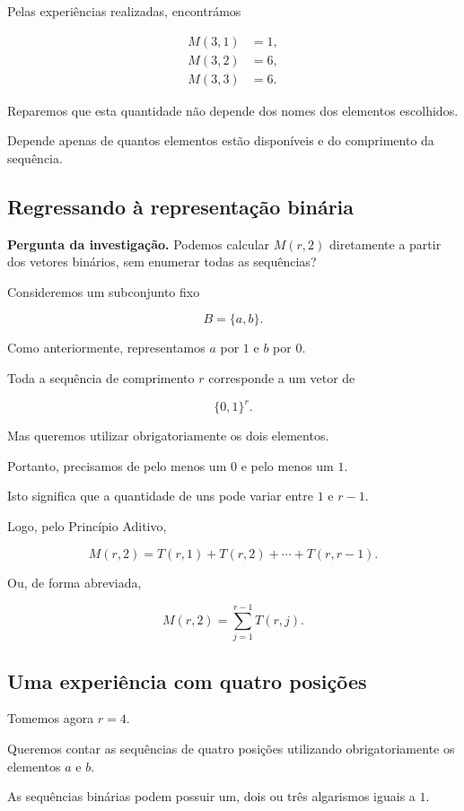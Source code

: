\documentclass[11pt,a4paper,oneside]{book}
\newcommand{\Pergunta}[1]{\begin{perguntabox}\textbf{Pergunta da investigação.} #1\end{perguntabox}}
\begin{document}
Pelas experiências realizadas, encontrámos

\[
\begin{aligned}
M(3,1)&=1,\\
M(3,2)&=6,\\
M(3,3)&=6.
\end{aligned}
\]

Reparemos que esta quantidade não depende
dos nomes dos elementos escolhidos.

Depende apenas de quantos elementos estão
disponíveis e do comprimento da sequência.

\subsection*{Regressando à representação binária}

\Pergunta{Podemos calcular $M(r,2)$ diretamente
a partir dos vetores binários, sem enumerar
todas as sequências?}

Consideremos um subconjunto fixo

\[
B=\{a,b\}.
\]

Como anteriormente, representamos $a$ por $1$
e $b$ por $0$.

Toda a sequência de comprimento $r$
corresponde a um vetor de

\[
\{0,1\}^r.
\]

Mas queremos utilizar obrigatoriamente
os dois elementos.

Portanto, precisamos de pelo menos um $0$
e pelo menos um $1$.

Isto significa que a quantidade de uns
pode variar entre $1$ e $r-1$.

Logo, pelo Princípio Aditivo,

\[
M(r,2)=
T(r,1)+T(r,2)+\cdots+T(r,r-1).
\]

Ou, de forma abreviada,

\[
\boxed{
M(r,2)=\sum_{j=1}^{r-1}T(r,j)
}.
\]

\subsection*{Uma experiência com quatro posições}

Tomemos agora $r=4$.

Queremos contar as sequências de quatro
posições utilizando obrigatoriamente
os elementos $a$ e $b$.

As sequências binárias podem possuir
um, dois ou três algarismos iguais a $1$.
\end{document}
